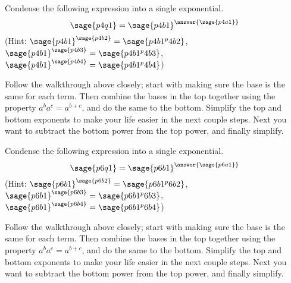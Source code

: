 \documentclass{ximera}
\begin{document}
\begin{problem}
    Condense the following expression into a single exponential.\\
    
    \[
        \sage{p4q1} = {\sage{p4b1}}^{\answer{\sage{p4a1}}}
    \]
    (Hint: $\sage{p4b1}^{\sage{p4b2}} = \sage{p4b1^p4b2}$, 
        ${\sage{p4b1}}^{\sage{p4b3}} = \sage{p4b1^p4b3}$, 
        $\sage{p4b1}^{\sage{p4b4}} = \sage{p4b1^p4b4}$)
    \begin{feedback}
        Follow the walkthrough above closely; start with making sure the base is the same for each term. Then combine the bases in the top together using the property $a^ba^c = a^{b+c}$, and do the same to the bottom. Simplify the top and bottom exponents to make your life easier in the next couple steps. Next you want to subtract the bottom power from the top power, and finally simplify.
    \end{feedback}
\end{problem}

\begin{problem}
    Condense the following expression into a single exponential.\\
    
    \[
        \sage{p6q1} = {\sage{p6b1}}^{\answer{\sage{p6a1}}}
    \]
    (Hint: ${\sage{p6b1}}^{\sage{p6b2}} = \sage{p6b1^p6b2}$, 
        $\sage{p6b1}^{\sage{p6b3}} = \sage{p6b1^p6b3}$, 
        $\sage{p6b1}^{\sage{p6b4}} = \sage{p6b1^p6b4}$)
    \begin{feedback}
        Follow the walkthrough above closely; start with making sure the base is the same for each term. Then combine the bases in the top together using the property $a^ba^c = a^{b+c}$, and do the same to the bottom. Simplify the top and bottom exponents to make your life easier in the next couple steps. Next you want to subtract the bottom power from the top power, and finally simplify.
    \end{feedback}
\end{problem}
\end{document}
